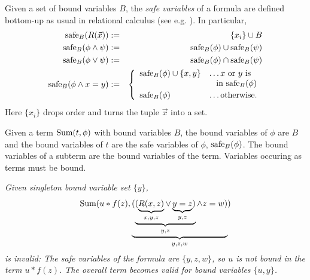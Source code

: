 Given a set of bound variables $B$,
the {\em safe variables} of a formula are defined bottom-up
as usual in relational
calculus (see e.g. \cite{DBLP:books/aw/AbiteboulHV95}). In particular,
\begin{eqnarray*}
\mbox{safe}_B(R(\vec{x})) &:=& \{x_i\} \cup B \\
\mbox{safe}_B(\phi \land \psi) &:=& \mbox{safe}_B(\phi) \cup \mbox{safe}_B(\psi) \\
\mbox{safe}_B(\phi \lor \psi)  &:=& \mbox{safe}_B(\phi) \cap \mbox{safe}_B(\psi) \\
\mbox{safe}_B(\phi \land x = y) &:=&
\left\{\begin{array}{ll}
\mbox{safe}_B(\phi) \cup \{ x, y \} &\dots
\mbox{$x$ or $y$ is} \\
&\;\;\; \mbox{in $\mbox{safe}_B(\phi)$} \\[.5ex]
\mbox{safe}_B(\phi) &\dots \mbox{otherwise}.
\end{array} \right.
\end{eqnarray*}
Here $\{x_i\}$ drops order and turns the tuple $\vec{x}$ into a set.

Given a term $\mbox{Sum}(t, \phi)$ with bound variables $B$,
the bound variables of $\phi$ are $B$ and the bound variables of $t$ are
the safe variables of $\phi$, $\mbox{safe}_B(\phi)$.
The bound variables of a subterm are the bound variables of the term.
Variables occuring as terms must be bound.

\begin{example}\em
Given singleton bound variable set $\{ y \}$,
\[ \mbox{Sum}(u * f(z), \underbrace{(\underbrace{(\underbrace{R(x, z)}_{x,y,z} \lor \underbrace{y=z}_{y,z})}_{y,z} \land z = w)}_{y,z,w}) \]
is invalid: The safe variables of the formula are
$\{y,z,w\}$, so $u$ is not bound in the term $u * f(z)$. The overall term
becomes valid for bound variables $\{u,y\}$.
\punto
\end{example}


\def\db{{\cal{A}}}

